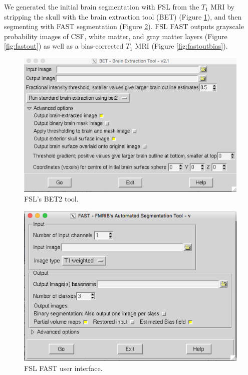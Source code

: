 We generated the initial brain segmentation with FSL from the $T_1$ MRI by stripping the skull with the brain extraction tool (BET) \cite{ref:bet1} (Figure \ref{fig:bet2}), and then segmenting with FAST segmentation (Figure \ref{fig:fslfast}). FSL FAST outputs grayscale probability images of CSF, white matter, and gray matter layers (Figure \ref{fig:fastout}) as well as a bias-corrected $T_1$ MRI (Figure \ref{fig:fastoutbias}). 

\begin{figure}[H]
\begin{center}
\includegraphics[width=.8\textwidth]{Figures/BET2}
\caption{FSL's BET2 tool.}
\label{fig:bet2}
\end{center}
\end{figure}

\begin{figure}[H]
    \centering
    \includegraphics[width=.8\textwidth]{Figures/FSL_FAST}
    \caption{FSL FAST user interface.}
    \label{fig:fslfast}
\end{figure}

